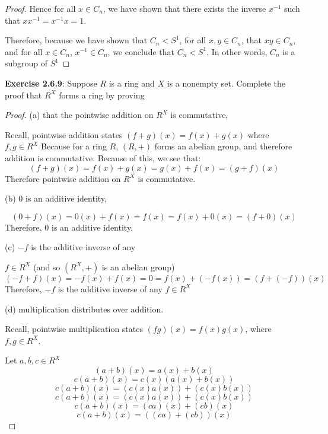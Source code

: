 \documentclass[a4paper]{article}
\begin{document}
\begin{myparindent}{0pt}
\begin{proof}
  Hence for all $x \in C_n$, we have shown that there exists the inverse $x^{-1}$
  such that $xx^{-1} = x^{-1}x = 1$. \newline

  Therefore, because we have shown that $C_n < S^1$, for all $x, y \in C_n$,
  that $xy \in C_n$, and for all $x \in C_n$, $x^{-1} \in C_n$, we conclude
  that $C_n < S^1$. In other words, $C_n$ is a subgroup of $S^1$

\end{proof}

\textbf{Exercise 2.6.9}:
Suppose $R$  is a ring and $X$ is a nonempty set. Complete the proof that $R^X$
forms a ring by proving

\begin{proof}
(a) that the pointwise addition on $R^X$ is commutative, \newline

  Recall, pointwise addition states $(f + g)(x) = f(x) + g(x)$ where $f, g \in R^X$
  Because for a ring $R$, $(R, +)$ forms an abelian group, and therefore addition
  is commutative. Because of this, we see that:
  \[ (f + g)(x) = f(x) + g(x) = g(x) + f(x) = (g + f)(x) \]
  Therefore pointwise addition on $R^X$ is commutative. \newline

(b) 0 is an additive identity,

  \[ (0 + f)(x) = 0(x) + f(x) = f(x) = f(x) + 0(x) = (f + 0)(x) \]
  Therefore, $0$ is an additive identity. \newline

(c) $-f$ is the additive inverse of any \newline

$f \in R^X$ (and so $(R^X, +)$ is an abelian group)
  \[ (-f + f)(x) = -f(x) + f(x) = 0 = f(x) + (-f(x)) = (f + (-f))(x) \]
  Therefore, $-f$ is the additive inverse of any $f \in R^X$ \newline

(d) multiplication distributes over addition. \newline

  Recall, pointwise multiplication states $(fg)(x) = f(x)g(x)$, where $f, g \in R^X$.
  \newline

  Let $a, b, c \in R^X$
  \[ (a + b)(x) = a(x) + b(x) \]
  \[ c(a + b)(x) = c(x) (a(x) + b(x)) \]
  \[ c(a + b)(x) = (c(x) a(x)) + (c(x) b(x)) \]
  \[ c(a + b)(x) = (c(x) a(x)) + (c(x) b(x)) \]
  \[ c(a + b)(x) = (ca)(x) + (cb)(x) \]
  \[ c(a + b)(x) = ((ca) + (cb))(x) \]


\end{proof}
\end{myparindent}
\end{document}
